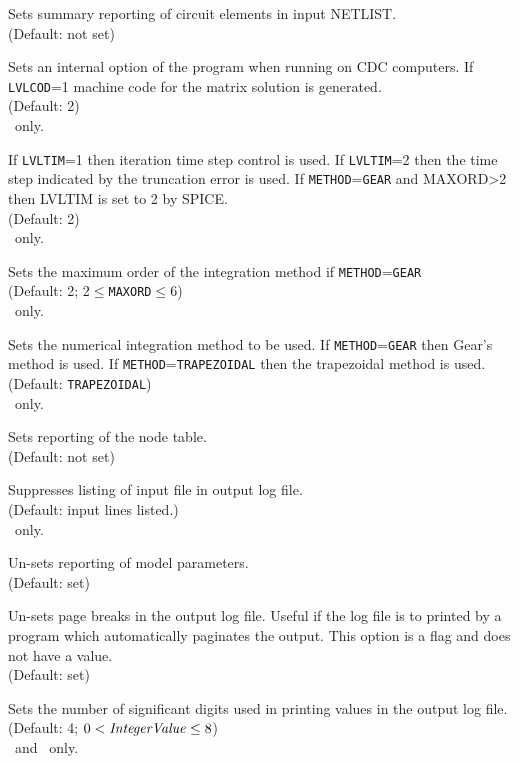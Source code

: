 \begin{widelist}

Sets summary reporting of circuit elements in input NETLIST.
\\(Default: not set)

{
Sets an internal option of the program when running on CDC computers.
If {\tt LVLCOD}=1 machine code for the matrix solution is generated.
\\(Default: 2)\\\spicetwo\ only.

If {\tt LVLTIM}=1 then iteration time step control is used.
If {\tt LVLTIM}=2 then the time step indicated by the truncation error is
used.
If {\tt METHOD}={\tt GEAR} and MAXORD>2 then LVLTIM is set to 2 by SPICE.
\\(Default: 2)\\\spicetwo\ only.

Sets the maximum order of the integration method if {\tt METHOD}={\tt GEAR}
\\(Default: 2; 2$\le${\tt MAXORD}$\le$6)\\\spicetwo\ only.

Sets the numerical integration method to be used.
If {\tt METHOD}={\tt GEAR} then Gear's method is used.
If {\tt METHOD}={\tt TRAPEZOIDAL} then the trapezoidal method is used.
\\(Default: {\tt TRAPEZOIDAL})\\\spicetwo\ only.
}

Sets reporting of the node table.
\\(Default: not set)

Suppresses listing of input file in output log file.
\\(Default: input lines listed.)
{\\\pspice\ only.}


Un-sets reporting of model parameters.
\\(Default: set)

Un-sets page breaks in the output log file.
Useful if the log file is to printed by a
program which automatically paginates the output.
This option is a flag and does not have a value.
\\(Default: set)

Sets the number of significant digits used in printing values in the output
log file.
\\(Default: 4; $0<{\it IntegerValue}\le 8$)
{\\\spicetwo\ and \pspice\ only.}

\end{widelist}


